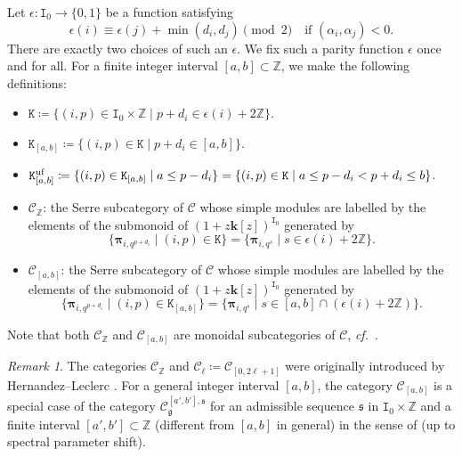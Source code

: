 \documentclass[12pt]{amsart}
\theoremstyle{definition}
\theoremstyle{remark}
\newtheorem{remark}[theorem]{Remark}
\numberwithin{equation}{section}
\newcommand{\confer}{\textit{cf.}\ }
\begin{document}
Let $\epsilon \colon \mathtt{I}_0 \to \{ 0,1\}$ be a function satisfying 
\[\epsilon(i) \equiv \epsilon(j) + \min(d_i,d_j) \pmod 2 \quad \text{if $(\alpha_i,\alpha_j)<0$}. \]
There are exactly two choices of such an $\epsilon$. We fix such a parity function $\epsilon$ once and for all.
For a finite integer interval $[a,b] \subset \mathbb{Z}$, we make the following definitions:
\begin{itemize}
    \item $\mathtt{K}\coloneqq \{(i,p)\in \mathtt I_0\times \mathbb Z\mid p+d_i\in \epsilon(i)+2\mathbb{Z}\}$.
    \item $\mathtt{K}_{[a,b]}\coloneqq \{(i,p)\in \mathtt{K}    \mid p+d_i\in [a,b]\}$.
    \item $\mathtt{K}_{[a,b]}^{\rm uf}\coloneqq \{(i,p)\in \mathtt{K}_{[a,b]} \mid a\leq p-d_i\}=\{(i,p)\in \mathtt{K} \mid a\leq p-d_i< p+d_i\leq b\}$.
    \item $\mathcal{C}_\mathbb{Z}$: the Serre subcategory of $\mathscr{C}$ 
 whose simple modules are labelled by the elements of the submonoid of $(1+z\mathbf{k}[z])^{\mathtt{I}_0}$ generated by $$\{  \boldsymbol{\pi}_{i,q^{p+d_i}} \mid (i,p)\in \mathtt K\}=\{  \boldsymbol{\pi}_{i,q^{s}} \mid s\in \epsilon(i)+2\mathbb{Z}\}.$$ 
 \item $\mathcal{C}_{[a,b]}$: the Serre subcategory of $\mathscr{C}$ 
 whose simple modules are labelled by the elements of the submonoid of $(1+z\mathbf{k}[z])^{\mathtt{I}_0}$ generated by $$\{  \boldsymbol{\pi}_{i,q^{p+d_i}} \mid (i,p)\in \mathtt K_{[a,b]}\}=\{  \boldsymbol{\pi}_{i,q^{s}} \mid s\in [a,b]\cap(\epsilon(i)+2\mathbb{Z})\}.$$ 
\end{itemize}
Note that both $\mathcal C_{\mathbb Z}$ and $\mathcal C_{[a,b]}$ are monoidal subcategories of $\mathscr{C}$, \confer \cites{HL_2010, kkop-2024}. 


\begin{remark}
    The categories $\mathcal{C}_\mathbb{Z}$ and $\mathcal C_{\ell}\coloneqq \mathcal C_{[0,2\ell +1]}$ were originally introduced by Hernandez--Leclerc \cite[\S 3]{HL_2010}. For a general integer interval $[a,b]$, the category $\mathcal{C}_{[a,b]}$ is a special case of the category $\mathscr{C}_{\mathfrak{g}}^{[a',b'],\mathfrak{s}}$ for  an admissible sequence $\mathfrak{s}$ in $\mathtt{I}_0 \times \mathbb{Z}$ and a finite interval $[a',b'] \subset \mathbb{Z}$ (different from $[a,b]$ in general) in the sense of \cite[\S6.3]{kkop-2024} (up to spectral parameter shift). 
\end{remark}
\end{document}
